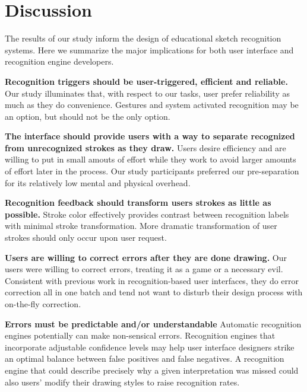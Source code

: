 \documentclass{egpubl}
\begin{document}

 
\section{Discussion}
The results of our study inform the design of educational sketch
recognition systems.  Here we summarize the major implications for
both user interface and recognition engine developers.

\textbf{Recognition triggers should be user-triggered, efficient and
reliable.} Our study illuminates that, with respect to our tasks, user
prefer reliability as much as they do convenience.  Gestures and
system activated recognition may be an option, but should not be the
only option.  

\textbf{The interface should provide users with a way to separate
recognized from unrecognized strokes as they draw.}  Users desire
efficiency and are willing to put in small amouts of effort while they
work to avoid larger amounts of effort later in the process.  Our
study participants preferred our pre-separation for its relatively low
mental and physical overhead.

\textbf{Recognition feedback should transform users strokes as little
as possible.} Stroke color effectively provides contrast between
recognition labels with minimal stroke transformation.  More dramatic
transformation of user strokes should only occur upon user request.

\textbf{Users are willing to correct errors after they are done
drawing.}  Our users were willing to correct errors, treating it as a
game or a necessary evil.  Consistent with previous work in
recognition-based user interfaces, they do error correction all in one
batch and tend not want to disturb their design process with
on-the-fly correction.  

\textbf{Errors must be predictable and/or understandable} Automatic
recognition engines potentially can make non-sensical errors.
Recognition engines that incorporate adjustable confidence levels may
help user interface designers strike an optimal balance between false
positives and false negatives.  A recognition engine that could
describe precisely why a given interpretation was missed could also
users' modify their drawing styles to raise recognition rates.  
\end{document}
